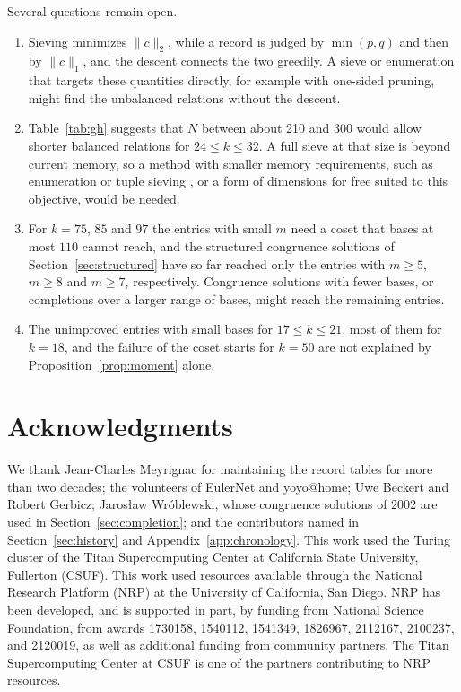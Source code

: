 \documentclass[11pt]{amsart}
\theoremstyle{definition}
\theoremstyle{remark}
\begin{document}
Several questions remain open.
\begin{enumerate}
\item Sieving minimizes $\|c\|_2$, while a record is judged by $\min(p,q)$ and then by
$\|c\|_1$, and the descent connects the two greedily. A sieve or enumeration that targets these
quantities directly, for example with one-sided pruning, might find the unbalanced relations
without the descent.
\item Table~\ref{tab:gh} suggests that $N$ between about 210 and 300 would allow shorter
balanced relations for $24\le k\le32$. A full sieve at that size is beyond current memory, so a
method with smaller memory requirements, such as enumeration or tuple sieving
\cite{BaiLaarhovenStehle2016}, or a form of dimensions for free suited to this objective, would
be needed.
\item For $k=75$, $85$ and $97$ the entries with small $m$ need a coset that bases at most $110$
cannot reach, and the structured congruence solutions of Section~\ref{sec:structured} have so
far reached only the entries with $m\ge5$, $m\ge8$ and $m\ge7$, respectively. Congruence solutions with fewer bases, or completions over a larger
range of bases, might reach the remaining entries.
\item The unimproved entries with small bases for $17\le k\le21$, most of them for $k=18$, and
the failure of the coset starts for $k=50$ are not explained by Proposition~\ref{prop:moment}
alone.
\end{enumerate}

\section*{Acknowledgments}
We thank Jean-Charles Meyrignac for maintaining the record tables for more than two decades;
the volunteers of EulerNet and yoyo@home; Uwe Beckert and Robert Gerbicz; Jaros\l aw
Wr\'oblewski, whose congruence solutions of 2002 are used in Section~\ref{sec:completion}; and
the contributors
named in Section~\ref{sec:history} and Appendix~\ref{app:chronology}. This work used the Turing
cluster of the Titan Supercomputing Center at California State University, Fullerton (CSUF). This work
used resources available through the National Research Platform (NRP) at the University of
California, San Diego. NRP has been developed, and is supported in part, by funding from
National Science Foundation, from awards 1730158, 1540112, 1541349, 1826967, 2112167, 2100237,
and 2120019, as well as additional funding from community partners. The Titan Supercomputing
Center at CSUF is one of the partners contributing to NRP resources.
\end{document}
